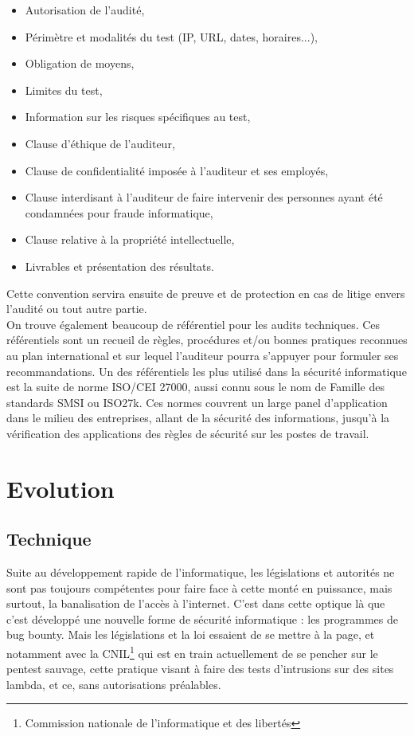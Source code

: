 \documentclass[a4paper]{memoir}
\begin{document}
\begin{itemize}
\item Autorisation de l'audité,
\item Périmètre et modalités du test (IP, URL, dates, horaires...),
\item Obligation de moyens,
\item Limites du test,
\item Information sur les risques spécifiques au test,
\item Clause d'éthique de l'auditeur,
\item Clause de confidentialité imposée à l'auditeur et ses employés,
\item Clause interdisant à l'auditeur de faire intervenir des personnes ayant été condamnées pour fraude informatique,
\item Clause relative à la propriété intellectuelle,
\item Livrables et présentation des résultats.\\
\end{itemize}

Cette convention servira ensuite de preuve et de protection en cas de litige envers l'audité ou tout autre partie. \\

On trouve également beaucoup de référentiel pour les audits techniques.
Ces référentiels sont un recueil de règles, procédures et/ou bonnes pratiques reconnues au plan international et sur lequel l'auditeur pourra s’appuyer pour formuler ses recommandations.
Un des référentiels les plus utilisé dans la sécurité informatique est la suite de norme ISO/CEI 27000, aussi connu sous le nom de Famille des standards SMSI ou ISO27k\cite{bworld4}. Ces normes couvrent un large panel d'application dans le milieu des entreprises, allant de la sécurité des informations, jusqu'à la vérification des applications des règles de sécurité sur les postes de travail.


\part{Evolution}

\chapter{Technique}

Suite au développement rapide de l'informatique, les législations et autorités ne sont pas toujours compétentes pour faire face à cette monté en puissance, mais surtout, la banalisation de l'accès à l'internet.
C'est dans cette optique là que c'est développé une nouvelle forme de sécurité informatique : les programmes de bug bounty.
Mais les législations et la loi essaient de se mettre à la page, et notamment avec la CNIL\footnote{Commission nationale de l'informatique et des libertés} qui est en train actuellement de se pencher sur le pentest sauvage, cette pratique visant à faire des tests d'intrusions sur des sites lambda, et ce, sans autorisations préalables. 
\end{document}
